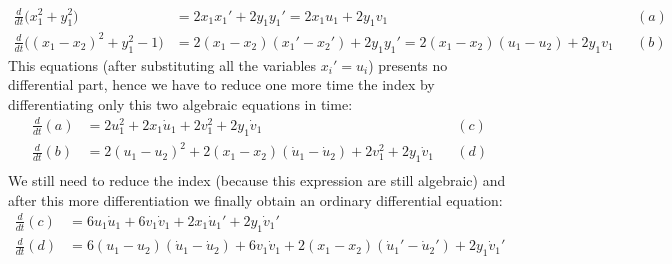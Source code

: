 	\begin{align*}
		\frac d{dt} \big( x_1^2 + y_1^2 \big) & = 2x_1 x_1' + 2 y_1 y_1' = 2x_1 u_1 + 2 y_1 v_1 && (a) \\
		\frac d{dt} \big( (x_1-x_2)^2 + y_1^2 - 1 \big) & = 2(x_1-x_2)(x_1'-x_2') +2 y_1 y_1' = 2(x_1-x_2)(u_1-u_2) + 2y_1 v_1 &&(b)
	\end{align*}
	This equations (after substituting all the variables $x_i' = u_i$) presents no differential part, hence we have to reduce one more time the index by differentiating only this two algebraic equations in time:
	\begin{align*}
		\frac d{dt}(a) & = 2 u_1^2 + 2x_1 \dot u_1 + 2 v_1^2 + 2 y_1 \dot v_1 && (c)\\
		\frac d{dt}(b) & = 2 (u_1 - u_2)^2 + 2 (x_1 - x_2)(\dot u_1 - \dot u_2) +2 v_1^2 +2 y_1 \dot v_1  && (d) \\
	\end{align*}
	We still need to reduce the index (because this expression are still algebraic) and after this more differentiation we finally obtain an ordinary differential equation:
	\begin{align*}
		\frac d{dt}(c) & = 6 u_1 \dot u_1 + 6 v_1\dot v_1 + 2 x_1 \dot u_1' + 2 y_1 \dot v_1' \\
		\frac d{dt}(d) & = 6(u_1-u_2)(\dot u_1 - \dot u_2) + 6 v_1\dot v_1 + 2 (x_1 -x_2)(\dot u_1' - \dot u_2') + 2 y_1 \dot v_1' \\
	\end{align*}
	
